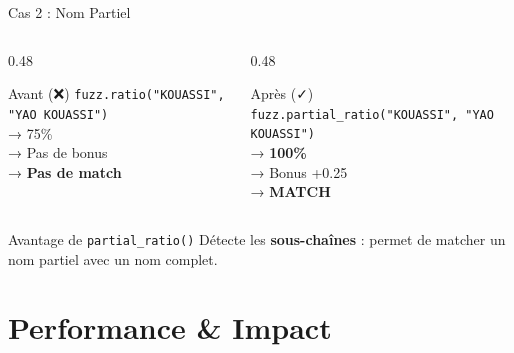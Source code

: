 \documentclass[aspectratio=169]{beamer}
\begin{document}
\begin{frame}{Cas 2 : Nom Partiel}
    \begin{columns}[T]
        \begin{column}{0.48\textwidth}
            \begin{alertblock}{Avant (❌)}
                \texttt{fuzz.ratio("KOUASSI", "YAO KOUASSI")} \\
                → 75\% \\
                → Pas de bonus \\
                → \textbf{Pas de match}
            \end{alertblock}
        \end{column}
        \begin{column}{0.48\textwidth}
            \begin{exampleblock}{Après (✓)}
                \texttt{fuzz.partial\_ratio("KOUASSI", "YAO KOUASSI")} \\
                → \textbf{100\%} \\
                → Bonus +0.25 \\
                → \textbf{\textcolor{vertSucces}{MATCH}}
            \end{exampleblock}
        \end{column}
    \end{columns}

    \vspace{0.5cm}

    \begin{block}{Avantage de \texttt{partial\_ratio()}}
        Détecte les \textbf{sous-chaînes} : permet de matcher un nom partiel avec un nom complet.
    \end{block}
\end{frame}

\section{Performance \& Impact}
\end{document}
